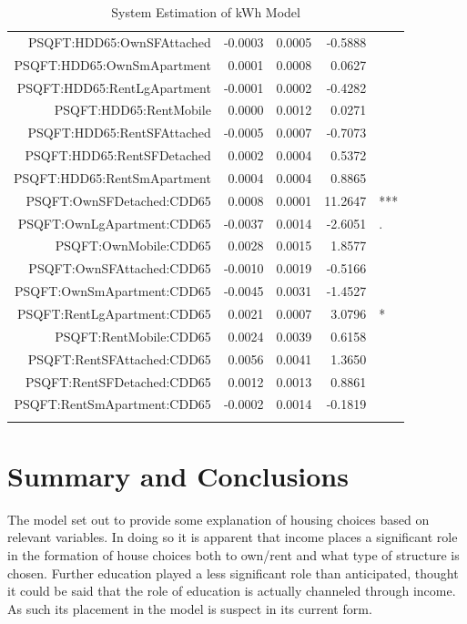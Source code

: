 \documentclass{article}
\begin{document}
\begin{longtable}{rrrrl}
  PSQFT:HDD65:OwnSFAttached & -0.0003 & 0.0005 & -0.5888 &   \\ 
  PSQFT:HDD65:OwnSmApartment & 0.0001 & 0.0008 & 0.0627 &   \\ 
  PSQFT:HDD65:RentLgApartment & -0.0001 & 0.0002 & -0.4282 &   \\ 
  PSQFT:HDD65:RentMobile & 0.0000 & 0.0012 & 0.0271 &   \\ 
  PSQFT:HDD65:RentSFAttached & -0.0005 & 0.0007 & -0.7073 &   \\ 
  PSQFT:HDD65:RentSFDetached & 0.0002 & 0.0004 & 0.5372 &   \\ 
  PSQFT:HDD65:RentSmApartment & 0.0004 & 0.0004 & 0.8865 &   \\ 
  PSQFT:OwnSFDetached:CDD65 & 0.0008 & 0.0001 & 11.2647 & *** \\ 
  PSQFT:OwnLgApartment:CDD65 & -0.0037 & 0.0014 & -2.6051 & . \\ 
  PSQFT:OwnMobile:CDD65 & 0.0028 & 0.0015 & 1.8577 &   \\ 
  PSQFT:OwnSFAttached:CDD65 & -0.0010 & 0.0019 & -0.5166 &   \\ 
  PSQFT:OwnSmApartment:CDD65 & -0.0045 & 0.0031 & -1.4527 &   \\ 
  PSQFT:RentLgApartment:CDD65 & 0.0021 & 0.0007 & 3.0796 & * \\ 
  PSQFT:RentMobile:CDD65 & 0.0024 & 0.0039 & 0.6158 &   \\ 
  PSQFT:RentSFAttached:CDD65 & 0.0056 & 0.0041 & 1.3650 &   \\ 
  PSQFT:RentSFDetached:CDD65 & 0.0012 & 0.0013 & 0.8861 &   \\ 
  PSQFT:RentSmApartment:CDD65 & -0.0002 & 0.0014 & -0.1819 &   \\ 
   \hline
\hline
\caption{System Estimation of kWh Model} 
\label{tab:SystemKWH}
\end{longtable}



\section{Summary and Conclusions}

The model set out to provide some explanation of housing choices based on relevant variables.  In doing so it is apparent that income places a significant role in the formation of house choices both to own/rent and what type of structure is chosen.  Further education played a less significant role than anticipated, thought it could be said that the role of education is actually channeled through income.  As such its placement in the model is suspect in its current form.
\end{document}
